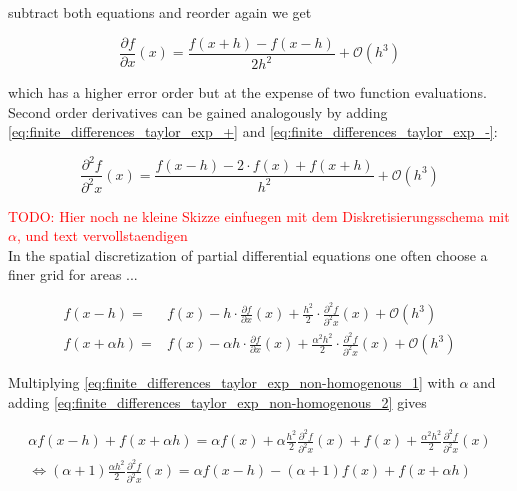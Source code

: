 \documentclass{scrartcl}[12pt, halfparskip]
\newcommand{\todo}[1]{\textcolor{red}{TODO: #1}}
\begin{document}
subtract both equations and reorder again we get

\begin{equation}
	\frac{\partial f}{\partial x}(x) = \frac{f(x+h) - f(x-h)}{2 h^2} + \mathcal{O}(h^3)
\end{equation}

which has a higher error order but at the expense of two function evaluations. \\

Second order derivatives can be gained analogously by adding \eqref{eq:finite_differences_taylor_exp_+} and \eqref{eq:finite_differences_taylor_exp_-}:

\begin{equation}
	\frac{\partial^2 f}{\partial^2 x}(x) = \frac{f(x-h) - 2 \cdot f(x) + f(x+h)}{h^2} + \mathcal{O}(h^3)
	\label{eq:finite_difference_2nd_der}
\end{equation}


\todo{Hier noch ne kleine Skizze einfuegen mit dem Diskretisierungsschema mit $\alpha$, und text vervollstaendigen} \\
In the spatial discretization of partial differential equations one often choose a finer grid for areas ...

\begin{subequations}
	\label{eq:finite_differences_taylor_exp_non-homogenous}
	\begin{align}
	f(x-h) = & f(x) - h \cdot \frac{\partial f}{\partial x}(x) + \frac{h^2}{2} \cdot \frac{\partial^2 f}{\partial^2 x}(x) + \mathcal{O}(h^3) \label{eq:finite_differences_taylor_exp_non-homogenous_1} \\
	f(x+\alpha h) = & f(x) - \alpha h \cdot \frac{\partial f}{\partial x}(x) + \frac{\alpha^2 h^2}{2} \cdot \frac{\partial^2 f}{\partial^2 x}(x) + \mathcal{O}(h^3)  \label{eq:finite_differences_taylor_exp_non-homogenous_2}
	\end{align}
\end{subequations}

Multiplying \eqref{eq:finite_differences_taylor_exp_non-homogenous_1} with $\alpha$ and adding \eqref{eq:finite_differences_taylor_exp_non-homogenous_2} gives

\begin{align}
	\alpha f(x-h) + f(x+\alpha h) = \alpha f(x) + \alpha \frac{h^2}{2} \frac{\partial^2 f}{\partial^2 x}(x) + f(x) + \frac{\alpha^2 h^2}{2} \frac{\partial^2 f}{\partial^2 x}(x) \\
	\Leftrightarrow (\alpha+1) \frac{\alpha h^2}{2} \frac{\partial^2 f}{\partial^2 x}(x) = \alpha f(x-h) - (\alpha+1) f(x) + f(x+\alpha h)
\end{align}
\end{document}
